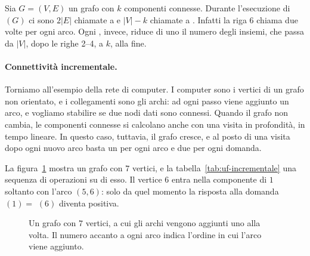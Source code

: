 \begin{osservazione}
Sia $G = (V,E)$ un grafo con $k$ componenti connesse. Durante l'esecuzione di \ConnectedComponents$(G)$ ci sono $2|E|$ chiamate a \FindSet{} e $|V| - k$ chiamate a \Union{}. Infatti la riga 6 chiama due volte \FindSet{} per ogni arco. Ogni \Union{}, invece, riduce di uno il numero degli insiemi, che passa da $|V|$, dopo le righe 2--4, a $k$, alla fine.
\end{osservazione}

\paragraph{Connettività incrementale.}
Torniamo all'esempio della rete di computer. I computer sono i vertici di un grafo non orientato, e i collegamenti sono gli archi: ad ogni passo viene aggiunto un arco, e vogliamo stabilire se due nodi dati sono connessi. Quando il grafo non cambia, le componenti connesse si calcolano anche con una visita in profondità, in tempo lineare. In questo caso, tuttavia, il grafo cresce, e al posto di una visita dopo ogni nuovo arco basta un \Union{} per ogni arco e due \FindSet{} per ogni domanda.

La figura~\ref{fig:uf-incrementale} mostra un grafo con $7$ vertici, e la tabella~\ref{tab:uf-incrementale} una sequenza di operazioni su di esso. Il vertice $6$ entra nella componente di $1$ soltanto con l'arco $(5,6)$: solo da quel momento la risposta alla domanda \FindSet$(1) =$ \FindSet$(6)$ diventa positiva.

\begin{figure}[htbp]
\centering
{}
\caption{Un grafo con $7$ vertici, a cui gli archi vengono aggiunti uno alla volta. Il numero accanto a ogni arco indica l'ordine in cui l'arco viene aggiunto.}
\label{fig:uf-incrementale}
\end{figure}

